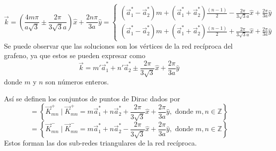 \begin{equation}
	\vec{k} = \left(\frac{4m\pi}{a\sqrt{3}}\pm \frac{2\pi}{3\sqrt{3}a}\right)\hat{x} + \frac{2n\pi}{3a}\hat{y} = \begin{cases}
		(\vec{a}_1^{\ast} - \vec{a}_2^{\ast})m + (\vec{a}_1^{\ast} + \vec{a}_2^{\ast})\frac{(n-1)}{2}- \frac{2\pi}{3\sqrt{3}a}\hat{x}+\frac{2\pi}{3a}\hat{y} \\
		(\vec{a}_1^{\ast} - \vec{a}_2^{\ast})m + (\vec{a}_1^{\ast} + \vec{a}_2^{\ast})\frac{(n-1)}{2}+ \frac{2\pi}{3\sqrt{3}a}\hat{x}+\frac{2\pi}{3a}\hat{y}
	\end{cases}
\end{equation}
Se puede observar que las soluciones son los vértices de la red recíproca del grafeno, ya que estos se pueden expresar como
\begin{equation}
	\vec{k} = m' \vec{a}_1^{\ast}+ n' \vec{a}_2^{\ast} \pm \frac{2\pi}{3\sqrt{3}}\hat{x}+\frac{2\pi}{3a}\hat{y}
\end{equation}
donde $m$ y $n$ son números enteros.\par
Así se definen los conjuntos de puntos de Dirac dados por
\begin{equation}
	[\vec{K}^{+}] = \left\{\vec{K}^{+}_{mn}\mid \vec{K}^{+}_{mn} =m \vec{a}_1^{\ast}+ n \vec{a}_2^{\ast} + \frac{2\pi}{3\sqrt{3}}\hat{x}+\frac{2\pi}{3a}\hat{y},\text{ donde }m,n \in \mathbb{Z} \right\}\label{eq:diracpointequiv1}
\end{equation}
\begin{equation}
	[\vec{K}^{-}] = \left\{\vec{K}^{-}_{mn}\mid \vec{K}^{-}_{mn} =m \vec{a}_1^{\ast}+ n \vec{a}_2^{\ast} - \frac{2\pi}{3\sqrt{3}}\hat{x}+\frac{2\pi}{3a}\hat{y},\text{ donde }m,n \in \mathbb{Z} \right\}\label{eq:diracpointequiv2}
\end{equation}
Estos forman las dos sub-redes triangulares de la red recíproca.
